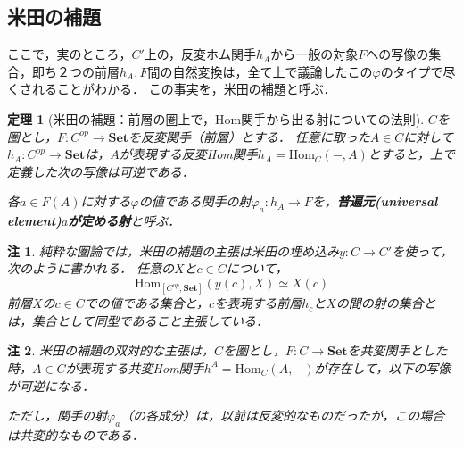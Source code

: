 \documentclass[uplatex, 12pt, dvipdfmx]{jsreport}
\newtheorem{theorem}{定理} \newtheorem{definition}{定義} \newtheorem{axiom}[definition]{公理} \newtheorem{proposition}[theorem]{命題} \newtheorem{corollary}[theorem]{系} \newtheorem{lemma}[theorem]{補題} \newtheorem{problem}{問} \newtheorem{solution}{解} \newtheorem{remark}{注}
\begin{document}
\subsection{米田の補題}

ここで，実のところ，$C'$上の，反変ホム関手$h_A$から一般の対象$F$への写像の集合，即ち２つの前層$h_A,F$間の自然変換は，全て上で議論したこの$\varphi$のタイプで尽くされることがわかる．
この事実を，米田の補題と呼ぶ．
\begin{shadebox}\begin{theorem}[米田の補題：前層の圏上で，Hom関手から出る射についての法則]\label{Yoneda's-lemma}\rm{}
    $C$を圏とし，$F:C^{op}\to\mathbf{Set}$を反変関手（前層）とする．
    任意に取った$A\in C$に対して$h_A:C^{op}\to\mathbf{Set}$は，$A$が表現する反変Hom関手$h_A=\mathrm{Hom}_C(-,A)$とすると，上で定義した次の写像は可逆である．
    \begin{center}\end{center}
    各$a\in F(A)$に対する$\varphi$の値である関手の射$\varphi_a:h_A\to F$を，\textbf{普遍元(universal element)$a$が定める射}と呼ぶ．
\end{theorem}\end{shadebox}
\begin{remark}
    純粋な圏論では，米田の補題の主張は米田の埋め込み$y:C\to C'$を使って，次のように書かれる．
    任意の$X$と$c\in C$について，$$\mathrm{Hom}_{[C^{op},\mathbf{Set}]}(y(c),X)\simeq X(c)$$
    前層$X$の$c\in C$での値である集合と，$c$を表現する前層$h_c$と$X$の間の射の集合とは，集合として同型であること主張している．
\end{remark}
\begin{remark}\rm{}
    米田の補題の双対的な主張は，$C$を圏とし，$F:C\to\mathbf{Set}$を共変関手とした時，$A\in C$が表現する共変Hom関手$h^A=\mathrm{Hom}_C(A,-)$が存在して，以下の写像が可逆になる．
    \begin{center}\end{center}
    ただし，関手の射$\varphi_a$（の各成分）は，以前は反変的なものだったが，この場合は共変的なものである．
    \begin{center}\end{center}
\end{remark}
\end{document}
